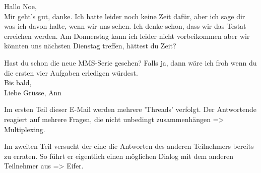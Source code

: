 Hallo Noe, \\
Mir geht's gut, danke. Ich hatte leider noch keine Zeit dafür, aber ich sage dir was ich davon halte, wenn wir uns sehen. 
Ich denke schon, dass wir das Testat erreichen werden.
Am Donnerstag kann ich leider nicht vorbeikommen aber wir könnten uns nächsten Dienstag treffen, hättest du Zeit?

Hast du schon die neue MMS-Serie gesehen? Falls ja, dann wäre
ich froh wenn du die ersten vier Aufgaben erledigen würdest.\\
Bis bald, \\
Liebe Grüsse, Ann


Im ersten Teil dieser E-Mail werden mehrere 'Threads' verfolgt. 
Der Antwortende reagiert auf mehrere Fragen, die nicht unbedingt
zusammenhängen => Multiplexing.

Im zweiten Teil versucht der eine die Antworten des anderen Teilnehmers 
bereits zu erraten. So führt er eigentlich einen möglichen Dialog
mit dem anderen Teilnehmer aus => Eifer.
